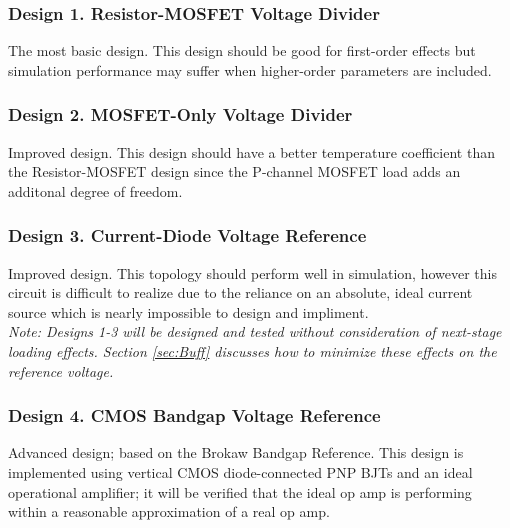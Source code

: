 \documentclass[conference]{IEEEtran}
\newcommand{\tab}{\hspace*{2em}}
\begin{document}
\subsubsection{Design 1. Resistor-MOSFET Voltage Divider}
The most basic design.  This design should be good for first-order effects but simulation performance may suffer when higher-order parameters are included.
\subsubsection{Design 2. MOSFET-Only Voltage Divider}
Improved design.  This design should have a better temperature coefficient than the Resistor-MOSFET design since the P-channel MOSFET load adds an additonal degree of freedom.
\subsubsection{Design 3. Current-Diode Voltage Reference}
Improved design.  This topology should perform well in simulation, however this circuit is difficult to realize due to the reliance on an absolute, ideal current source which is nearly impossible to design and impliment.\\
\tab\emph{Note: Designs 1-3 will be designed and tested without consideration of next-stage loading effects.  Section \ref{sec:Buff} discusses how to minimize these effects on the reference voltage.}
\subsubsection{Design 4. CMOS Bandgap Voltage Reference}
Advanced design; based on the Brokaw Bandgap Reference.  This design is implemented using vertical CMOS diode-connected PNP BJTs and an ideal operational amplifier; it will be verified that the ideal op amp is performing within a reasonable approximation of a real op amp.
\end{document}
